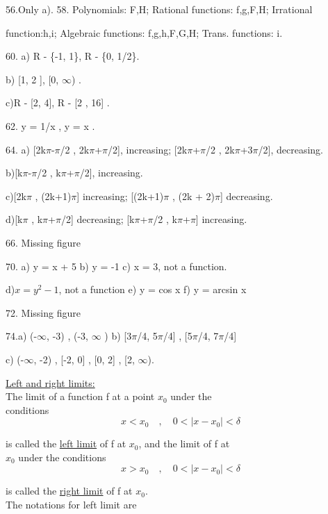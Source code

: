 \documentclass[11pt]{amsbook}
\begin{document}
\begin{flushleft}



 56.Only a). 58. Polynomials: F,H; Rational functions: f,g,F,H; Irrational 

function:h,i; Algebraic functions: f,g,h,F,G,H; Trans. functions: i.

60. a) R - \{-1, 1\}, R - \{0, 1/2\}.

 b) [1, 2 ], [0, $\infty$) .
 
 c)R - [2, 4], R - [2 , 16] .
 
62. y = 1/x , y = x .

64. a) [2k$\pi$-$\pi$/2 , 2k$\pi$+$\pi$/2], increasing; [2k$\pi$+$\pi$/2 , 2k$\pi$+3$\pi$/2], decreasing.
	
	b)[k$\pi$-$\pi$/2 , k$\pi$+$\pi$/2], increasing.
	
	c)[2k$\pi$ , (2k+1)$\pi$] increasing; [(2k+1)$\pi$ , (2k + 2)$\pi$] decreasing. 
	
	d)[k$\pi$ , k$\pi$+$\pi$/2] decreasing; [k$\pi$+$\pi$/2 , k$\pi$+$\pi$] increasing.
	
66. Missing figure

70. a) y = x + 5  b) y = -1  c) x = 3, not a function.

d)$x = y^2 - 1$, not a function e) y = cos x f) y = arcsin x

72. Missing figure

74.a) (-$\infty$, -3) , (-3, $\infty$ ) b) [3$\pi$/4, 5$\pi$/4] , [5$\pi$/4, 7$\pi$/4]

c) (-$\infty$, -2) , [-2, 0] , [0, 2] , [2, $\infty$).

\end{flushleft}

\underline{Left and right limits:}\\
\indent The limit of a function f at a point $x_0$ under the \\
conditions\\
$$x< x_0 \quad , \quad 0<|x-x_0|<\delta  $$ 

is called the \underline{left limit} of f at $x_0$, and the limit of f at \\
$x_0$ under the conditions\\
$$x> x_0 \quad , \quad 0<|x-x_0|<\delta  $$ 

is called the \underline{right limit} of f at $x_0$.\\
\indent \indent The notations for left limit are\\\\
\end{document}
